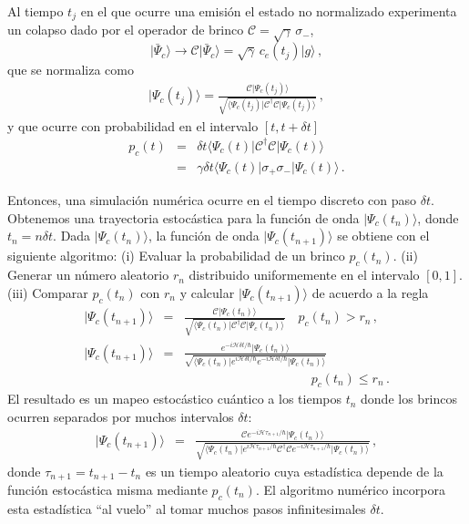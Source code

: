 \documentclass[twocolumn,aps,eqsecnum,showkeys,amsmath]{revtex4}
\newcommand{\mcC}{\mathcal{C}}
\newcommand{\mcH}{\mathcal{H}} 	%
\providecommand{\bra}[1]{\langle #1 \rvert}
\providecommand{\ket}[1]{\lvert #1 \rangle}
\begin{document}
Al tiempo $t_j$ en el que ocurre una emisi\'on el estado no normalizado 
experimenta un colapso dado por el operador de brinco 
$\mcC = \sqrt{\gamma}\, \sigma_-$,  
%
\begin{equation}
\ket{ \bar{\Psi}_c } \to \mcC \ket{ \bar{\Psi}_c } 
	= \sqrt{\gamma}\, c_e (t_j) \ket{g} 	\,,
\end{equation}
que se normaliza como 
\begin{eqnarray} 	\label{jump}
\ket{\Psi_c(t_j)} = \frac{\mcC \ket{\Psi_c(t_j) } }
  	 {\sqrt{\bra{\Psi_c(t_j)}  \mcC^\dag \mcC \ket{\Psi_c(t_j)} } } \,,	
\end{eqnarray}
y que ocurre con probabilidad en el intervalo $[t, t+ \delta t]$ 
%
\begin{eqnarray} 	\label{JumpProb}
p_c(t) &=& \delta t \bra{\Psi_c (t)} \mcC^\dag \mcC \ket{\Psi_c (t)} 	\\ 
	&=& \gamma \delta t \bra{\Psi_c (t)} \sigma_+ \sigma_- \ket{\Psi_c (t)}
	\nonumber \,.
\end{eqnarray}

Entonces, una simulaci\'on num\'erica ocurre en el tiempo discreto con paso 
$\delta t$. Obtenemos una trayectoria estoc\'astica para la funci\'on de onda 
$\ket{\Psi_c (t_n)}$, donde $t_n = n \delta t$. Dada $\ket{\Psi_c (t_n)}$, la 
funci\'on de onda $\ket{\Psi_c (t_{n+1})}$ se obtiene con el siguiente algoritmo: 
\newline (i) Evaluar la probabilidad de un brinco $p_c (t_n)$. 
\newline (ii) Generar un n\'umero aleatorio $r_n$ distribuido uniformemente en el intervalo $[0,1]$. 
\newline (iii) Comparar $p_c(t_n)$ con $r_n$ y calcular  $\ket{\Psi_c (t_{n+1})}$ 
de acuerdo a la regla   
\begin{subequations}
\begin{eqnarray*} 	%
\ket{\Psi_c(t_{n+1}) } &=& \frac{\mcC \ket{\Psi_c(t_n) } } 
	{\sqrt{\bra{\Psi_c(t_n)} \mcC^\dag \mcC \ket{\Psi_c(t_n)} } } 		
	\quad p_c (t_n) > r_n \,, 	\\ 
\ket{\Psi_c(t_{n+1}) } 
	&=& \frac{ e^{- i \mcH \delta t /\hbar} \ket{ \Psi_c(t_n) } } 
	{\sqrt{\bra{\Psi_c(t_n)} e^{ i \mcH \delta t /\hbar} 
	e^{- i \mcH \delta t /\hbar} \ket{\Psi_c(t_n)} } } 		\\ 
	&& \qquad  \qquad  \qquad  \qquad  \qquad p_c (t_n) \leq r_n \,. 	
\end{eqnarray*}
\end{subequations}
El resultado es un mapeo estoc\'astico cu\'antico a los tiempos $t_n$ donde  
los brincos ocurren separados por muchos intervalos $\delta t$: 
\begin{eqnarray*} 	
\ket{\Psi_c(t_{n+1}) } 
	&=& \frac{ \mcC e^{- i \mcH \tau_{n+1} /\hbar} \ket{\Psi_c(t_n) } } 
	{\sqrt{\bra{\Psi_c(t_n)} e^{ i \mcH \tau_{n+1} /\hbar} \mcC^\dag 		
	\mcC e^{- i \mcH \tau_{n+1} /\hbar} \ket{\Psi_c(t_n)} } } 	\,,	
\end{eqnarray*}
donde $\tau_{n+1} = t_{n+1} -t_n$ es un tiempo aleatorio cuya estad\'istica 
depende de la funci\'on estoc\'astica misma mediante $p_c (t_n)$. El algoritmo num\'erico incorpora esta estad\'istica ``al vuelo'' al tomar muchos pasos 
infinitesimales $\delta t$. 
\end{document}
